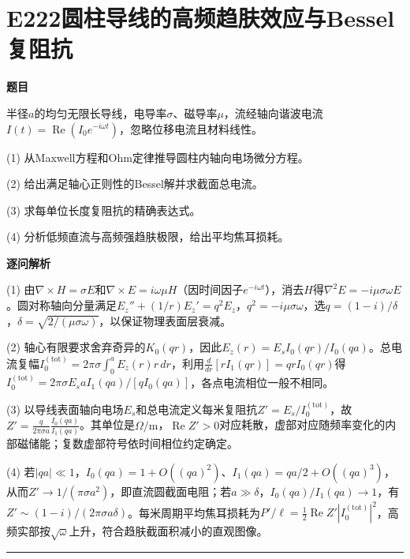 \documentclass[UTF8,a4paper,11pt,oneside,openany]{ctexbook}
\begin{document}
\section*{E222\quad 圆柱导线的高频趋肤效应与Bessel复阻抗}
\textbf{题目}\par
半径$a$的均匀无限长导线，电导率$\sigma$、磁导率$\mu$，流经轴向谐波电流$I(t)=\operatorname{Re}(I_0e^{-i\omega t})$，忽略位移电流且材料线性。
\par\smallskip\noindent (1) 从Maxwell方程和Ohm定律推导圆柱内轴向电场微分方程。
\par\smallskip\noindent (2) 给出满足轴心正则性的Bessel解并求截面总电流。
\par\smallskip\noindent (3) 求每单位长度复阻抗的精确表达式。
\par\smallskip\noindent (4) 分析低频直流与高频强趋肤极限，给出平均焦耳损耗。
\par\medskip\textbf{逐问解析}\par
\par\smallskip\noindent (1) 由$\nabla\times H=\sigma E$和$\nabla\times E=i\omega\mu H$（因时间因子$e^{-i\omega t}$），消去$H$得$\nabla^2E=-i\mu\sigma\omega E$。圆对称轴向分量满足$E_z''+(1/r)E_z'=q^2E_z$，$q^2=-i\mu\sigma\omega$，选$q=(1-i)/\delta$，$\delta=\sqrt{2/(\mu\sigma\omega)}$，以保证物理表面层衰减。
\par\smallskip\noindent (2) 轴心有限要求舍弃奇异的$K_0(qr)$，因此$E_z(r)=E_s I_0(qr)/I_0(qa)$。总电流复幅$I_0^{(\mathrm{tot})}=2\pi\sigma\int_0^a E_z(r)r\,dr$，利用$\frac{d}{dr}[rI_1(qr)]=qrI_0(qr)$得$I_0^{(\mathrm{tot})}=2\pi\sigma E_sa I_1(qa)/[qI_0(qa)]$，各点电流相位一般不相同。
\par\smallskip\noindent (3) 以导线表面轴向电场$E_s$和总电流定义每米复阻抗$Z'=E_s/I_0^{(\mathrm{tot})}$，故$Z'=\frac q{2\pi\sigma a}\frac{I_0(qa)}{I_1(qa)}$。其单位是$\Omega/\mathrm m$，$\operatorname{Re}Z'>0$对应耗散，虚部对应随频率变化的内部磁储能；复数虚部符号依时间相位约定确定。
\par\smallskip\noindent (4) 若$|qa|\ll1$，$I_0(qa)=1+O((qa)^2)$、$I_1(qa)=qa/2+O((qa)^3)$，从而$Z'\to1/(\pi\sigma a^2)$，即直流圆截面电阻；若$a\gg\delta$，$I_0(qa)/I_1(qa)\to1$，有$Z'\sim(1-i)/(2\pi\sigma a\delta)$。每米周期平均焦耳损耗为$P'/\ell=\tfrac12\operatorname{Re}Z'|I_0^{(\mathrm{tot})}|^2$，高频实部按$\sqrt\omega$上升，符合趋肤截面积减小的直观图像。
\par\medskip\hrule\medskip
\end{document}
